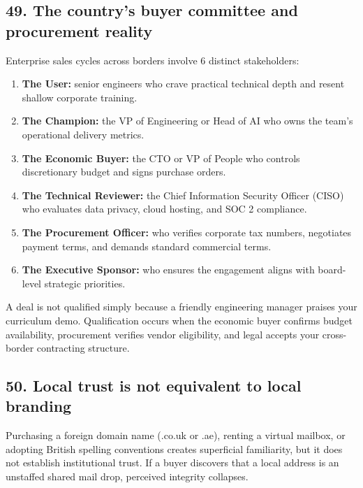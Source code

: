 \subsection{49. The country's buyer committee and procurement reality}

Enterprise sales cycles across borders involve 6 distinct stakeholders:
\begin{enumerate}
    \item \textbf{The User:} senior engineers who crave practical technical depth and resent shallow corporate training.
    \item \textbf{The Champion:} the VP of Engineering or Head of AI who owns the team's operational delivery metrics.
    \item \textbf{The Economic Buyer:} the CTO or VP of People who controls discretionary budget and signs purchase orders.
    \item \textbf{The Technical Reviewer:} the Chief Information Security Officer (CISO) who evaluates data privacy, cloud hosting, and SOC 2 compliance.
    \item \textbf{The Procurement Officer:} who verifies corporate tax numbers, negotiates payment terms, and demands standard commercial terms.
    \item \textbf{The Executive Sponsor:} who ensures the engagement aligns with board-level strategic priorities.
\end{enumerate}

A deal is not qualified simply because a friendly engineering manager praises your curriculum demo. Qualification occurs when the economic buyer confirms budget availability, procurement verifies vendor eligibility, and legal accepts your cross-border contracting structure.

\subsection{50. Local trust is not equivalent to local branding}

Purchasing a foreign domain name (.co.uk or .ae), renting a virtual mailbox, or adopting British spelling conventions creates superficial familiarity, but it does not establish institutional trust. If a buyer discovers that a local address is an unstaffed shared mail drop, perceived integrity collapses.

